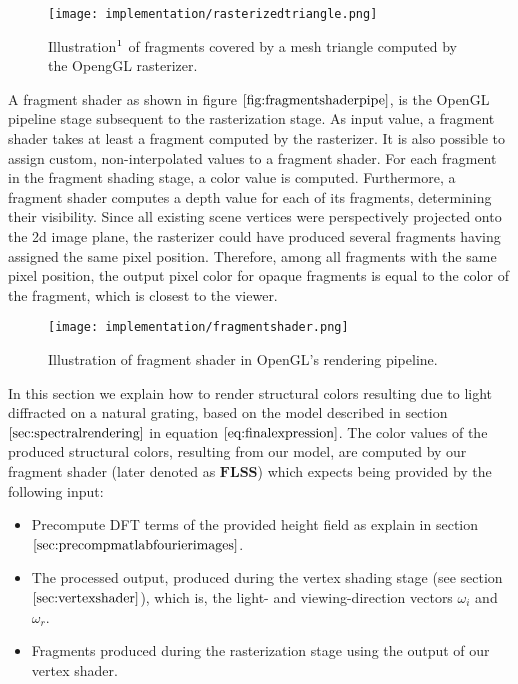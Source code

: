 \begin{figure}[H]
  \centering
  \texttt{[image: implementation/rasterizedtriangle.png]}
  \caption[Triangle Rasterization]{Illustration$\footnotemark$ of fragments covered by a mesh triangle computed by the OpengGL rasterizer.}
  \label{fig:trianglerasterization}
\end{figure}

A fragment shader as shown in figure $\ref{fig:fragmentshaderpipe}$, is the OpenGL pipeline stage subsequent to the rasterization stage. As input value, a fragment shader takes at least a fragment computed by the rasterizer. It is also possible to assign custom, non-interpolated values to a fragment shader. For each fragment in the fragment shading stage, a color value is computed. Furthermore, a fragment shader computes a depth value for each of its fragments, determining their visibility. Since all existing scene vertices were perspectively projected onto the 2d image plane, the rasterizer could have produced several fragments having assigned the same pixel position. Therefore, among all fragments with the same pixel position, the output pixel color for opaque fragments is equal to the color of the fragment, which is closest to the viewer.

\begin{figure}[H]
  \centering
  \texttt{[image: implementation/fragmentshader.png]}
  \caption[Fragment Shader]{Illustration of fragment shader in OpenGL's rendering pipeline.}
  \label{fig:fragmentshaderpipe}
\end{figure}

\label{sec:flssshader}
\label{sec:inputlists}
In this section we explain how to render structural colors resulting due to light diffracted on a natural grating, based on the model described in section $\ref{sec:spectralrendering}$ in equation $\ref{eq:finalexpression}$. The color values of the produced structural colors, resulting from our model, are computed by our fragment shader (later denoted as $\textbf{FLSS}$) which expects being provided by the following input:

\begin{itemize}
  \item Precompute DFT terms of the provided height field as explain in section $\ref{sec:precompmatlabfourierimages}$.
  \item The processed output, produced during the vertex shading stage (see section $\ref{sec:vertexshader}$), which is, the light- and viewing-direction vectors $\omega_i$ and $\omega_r$.
  \item Fragments produced during the rasterization stage using the output of our vertex shader.
\end{itemize}

